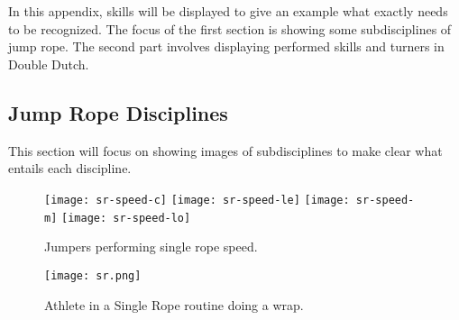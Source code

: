 \chapter{}%
\label{ch:skills and turners}


In this appendix, skills will be displayed to give an example what exactly needs to be recognized. The focus of the first section is showing some subdisciplines of jump rope. The second part involves displaying performed skills and turners in Double Dutch.

\section{Jump Rope Disciplines}
\label{subsubsec:jump-rope-disciplines}

This section will focus on showing images of subdisciplines to make clear what entails each discipline.

\begin{figure}
    \centering
    \texttt{[image: sr-speed-c]}
    \texttt{[image: sr-speed-le]}
    \texttt{[image: sr-speed-m]}
    \texttt{[image: sr-speed-lo]}
    \label{fig:sr-speed-c}
    \caption[Jumpers performing single rope speed]{Jumpers performing single rope speed.}
\end{figure}

\begin{figure}
    \centering
    \texttt{[image: sr.png]}
    \caption[Athlete in a Single Rope routine]{Athlete in a Single Rope routine doing a wrap.}
    \label{fig:sr-wrap}
\end{figure}




